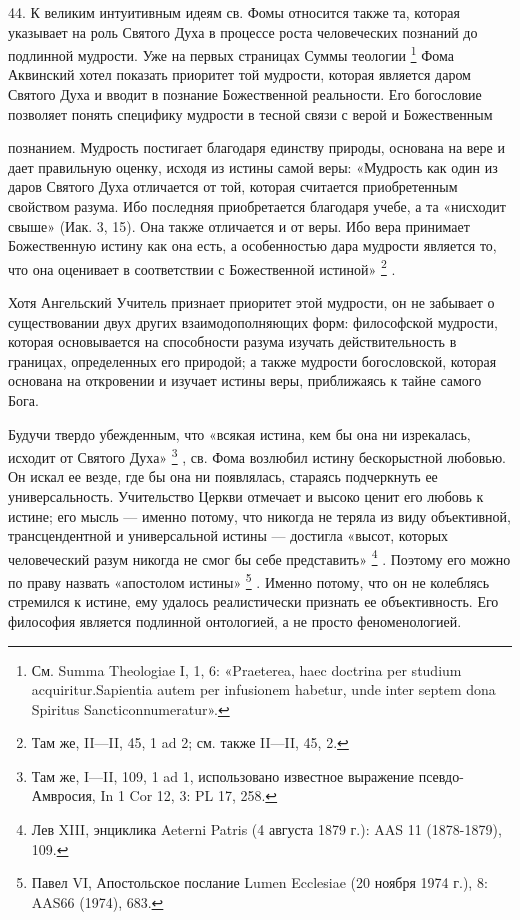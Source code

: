 \documentclass[a5paper,10pt]{article}
\begin{document}
44. К великим интуитивным идеям св. Фомы относится также та, которая указывает
на роль Святого Духа в процессе роста человеческих познаний до подлинной
мудрости. Уже на первых страницах Суммы теологии \footnote{См. Summa Theologiae
I, 1, 6: «Praeterea, haec doctrina per studium acquiritur.Sapientia autem per
infusionem habetur, unde inter septem dona Spiritus Sancticonnumeratur».}  Фома
Аквинский хотел показать приоритет той мудрости, которая является даром Святого
Духа и вводит в познание Божественной реальности. Его богословие позволяет
понять специфику мудрости в тесной связи с верой и Божественным

познанием. Мудрость постигает благодаря единству природы, основана на вере и
дает правильную оценку, исходя из истины самой веры: «Мудрость как один из
даров Святого Духа отличается от той, которая считается приобретенным свойством
разума. Ибо последняя приобретается благодаря учебе, а та «нисходит свыше»
(Иак. 3, 15). Она также отличается и от веры. Ибо вера принимает Божественную
истину как она есть, а особенностью дара мудрости является то, что она
оценивает в соответствии с Божественной истиной» \footnote{Там же, II—II, 45, 1
ad 2; см. также II—II, 45, 2.}  .

Хотя Ангельский Учитель признает приоритет этой мудрости, он не забывает о
существовании двух других взаимодополняющих форм: философской мудрости, которая
основывается на способности разума изучать действительность в границах,
определенных его природой; а также мудрости богословской, которая основана на
откровении и изучает истины веры, приближаясь к тайне самого Бога.

Будучи твердо убежденным, что «всякая истина, кем бы она ни изрекалась, исходит
от Святого Духа» \footnote{Там же, I—II, 109, 1 ad 1, использовано известное
выражение псевдо-Амвросия, In 1 Cor 12, 3: PL 17, 258.}  , св. Фома возлюбил
истину бескорыстной любовью. Он искал ее везде, где бы она ни появлялась,
стараясь подчеркнуть ее универсальность.  Учительство Церкви отмечает и высоко
ценит его любовь к истине; его мысль — именно потому, что никогда не теряла из
виду объективной, трансцендентной и универсальной истины — достигла «высот,
которых человеческий разум никогда не смог бы себе представить» \footnote{Лев
XIII, энциклика Aeterni Patris (4 августа 1879 г.): AAS 11 (1878-1879), 109.} .
Поэтому его можно по праву назвать «апостолом истины» \footnote{Павел VI,
Апостольское послание Lumen Ecclesiae (20 ноября 1974 г.), 8: AAS66 (1974),
683.}  . Именно потому, что он не колеблясь стремился к истине, ему удалось
реалистически признать ее объективность. Его философия является подлинной
онтологией, а не просто феноменологией.
\end{document}
